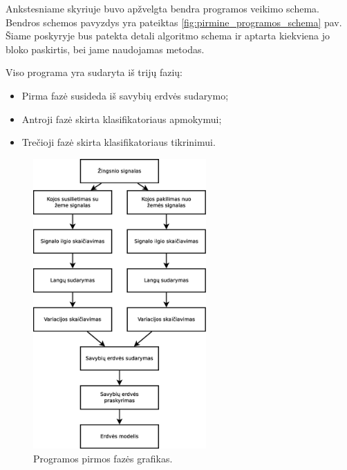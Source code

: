 \documentclass[]{vgtuef}
\begin{document}
Ankstesniame skyriuje buvo apžvelgta bendra programos veikimo
schema. Bendros schemos pavyzdys yra pateiktas
\ref{fig:pirmine_programos_schema} pav. Šiame  poskyryje bus patekta
detali algoritmo schema ir aptarta kiekviena jo bloko paskirtis, bei
jame naudojamas metodas.

Viso programa yra sudaryta iš trijų fazių:

\begin{itemize}
\item Pirma fazė susideda iš savybių erdvės sudarymo;
\item Antroji fazė skirta klasifikatoriaus apmokymui;
\item Trečioji fazė skirta klasifikatoriaus tikrinimui.
\end{itemize}

\begin{figure}[!t]
  \centering
  \includegraphics[width=250px]{figures/pirma_faze.eps}
  \caption{Programos pirmos fazės grafikas.}
  \label{fig:pirma_faze}
\end{figure}
\end{document}
